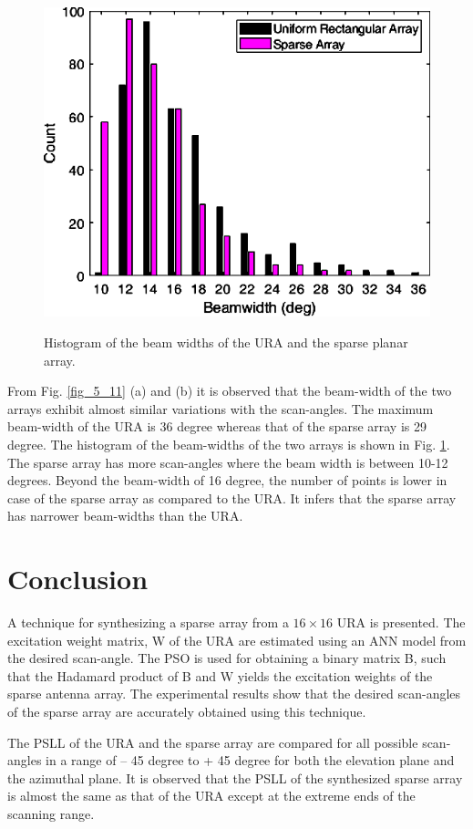 \begin{figure}
  \centering
  \includegraphics[width=0.5\linewidth]{Fig-naun_12.eps}\\
  \caption{Histogram of the beam widths of the URA and the sparse planar array.} \label{fig_5_12}
\end{figure}

From Fig. \ref{fig_5_11} (a) and (b) it is observed that the beam-width of the two arrays exhibit almost similar variations with the scan-angles. The maximum beam-width of the URA is 36 degree whereas that of the sparse array is 29 degree. The histogram of the beam-widths of the two arrays is shown in Fig. \ref{fig_5_12}. The sparse array has more scan-angles where the beam width is between 10-12 degrees. Beyond the beam-width of 16 degree, the number of points is lower in case of the sparse array as compared to the URA. It infers that the sparse array has narrower beam-widths than the URA.

\section{Conclusion} \label{c5sec_cncl}
A technique for synthesizing a sparse array from a $16\times 16$ URA is presented. The excitation weight matrix, W of the URA are estimated using an ANN model from the desired scan-angle. The PSO is used for obtaining a binary matrix B, such that the Hadamard product of B and W yields the excitation weights of the sparse antenna array. The experimental results show that the desired scan-angles of the sparse array are accurately obtained using this technique.

The PSLL of the URA and the sparse array are compared for all possible scan-angles in a range of -- 45 degree to + 45 degree for both the elevation plane and the azimuthal plane. It is observed that the PSLL of the synthesized sparse array is almost the same as that of the URA except at the extreme ends of the scanning range.

